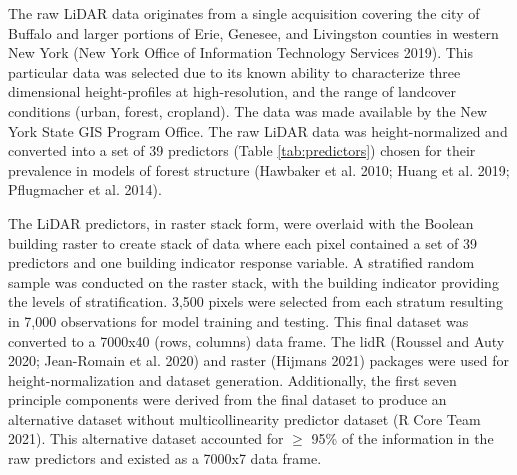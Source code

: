 \documentclass[review]{elsarticle} %
\begin{document}
The raw LiDAR data originates from a single acquisition covering the city
of Buffalo and larger portions of Erie, Genesee, and Livingston counties in
western New York (New York Office of Information Technology Services 2019).
This particular data was selected due to its known ability to characterize
three dimensional height-profiles at high-resolution, and the range of
landcover conditions (urban, forest, cropland).
The data was made available by the New York State GIS Program Office.
The raw LiDAR data was height-normalized and converted into a set of 39
predictors (Table \ref{tab:predictors}) chosen for their prevalence in models
of forest structure (Hawbaker et al. 2010; Huang et al. 2019; Pflugmacher et al. 2014).

The LiDAR predictors, in raster stack form, were overlaid with the Boolean
building raster to create stack of data where each pixel contained a set of 39
predictors and one building indicator response variable.
A stratified random sample was conducted on the raster stack, with the building
indicator providing the levels of stratification.
3,500 pixels were selected from each stratum resulting in 7,000 observations for model training and testing.
This final dataset was converted to a 7000x40 (rows, columns) data frame.
The lidR (Roussel and Auty 2020; Jean-Romain et al. 2020) and raster (Hijmans 2021) packages were used for
height-normalization and dataset generation.
Additionally, the first seven principle components were derived from the final dataset to produce an alternative dataset without multicollinearity predictor
dataset (R Core Team 2021).
This alternative dataset accounted for \(\ge\) 95\% of the information in the raw predictors and existed as a 7000x7 data frame.
\end{document}
